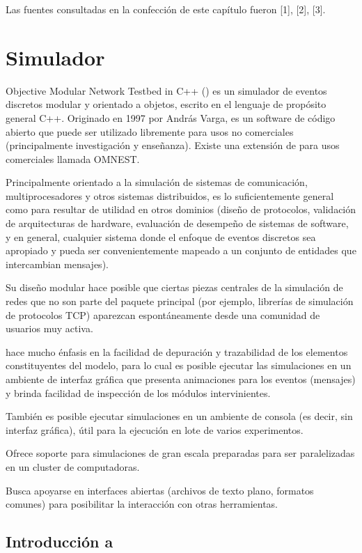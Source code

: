 Las fuentes consultadas en la confección de este capítulo fueron [1], [2], [3].

\section{Simulador \omnetpp{}}

Objective Modular Network Testbed in C++ (\omnetpp{}) es un simulador de eventos
discretos modular y orientado a objetos, escrito en el lenguaje de propósito
general C++. Originado en 1997 por András Varga, es un software de código
abierto que puede ser utilizado libremente para usos no comerciales
(principalmente investigación y enseñanza). Existe una extensión de \omnetpp{}
para usos comerciales llamada OMNEST.

Principalmente orientado a la simulación de sistemas de comunicación,
multiprocesadores y otros sistemas distribuidos, \omnetpp{} es lo suficientemente
general como para resultar de utilidad en otros dominios (diseño de protocolos,
validación de arquitecturas de hardware, evaluación de desempeño de sistemas de
software, y en general, cualquier sistema donde el enfoque de eventos discretos
sea apropiado y pueda ser convenientemente mapeado a un conjunto de entidades
que intercambian mensajes).

Su diseño modular hace posible que ciertas piezas centrales de la simulación de
redes que no son parte del paquete principal (por ejemplo, librerías de
simulación de protocolos TCP) aparezcan espontáneamente desde una comunidad de
usuarios muy activa.

\omnetpp{} hace mucho énfasis en la facilidad de depuración y trazabilidad de
los elementos constituyentes del modelo, para lo cual es posible ejecutar las
simulaciones en un ambiente de interfaz gráfica que presenta animaciones para
los eventos (mensajes) y brinda facilidad de inspección de los módulos
intervinientes.

También es posible ejecutar simulaciones en un ambiente de consola (es decir,
sin interfaz gráfica), útil para la ejecución en lote de varios experimentos.

Ofrece soporte para simulaciones de gran escala preparadas para ser
paralelizadas en un cluster de computadoras.

Busca apoyarse en interfaces abiertas (archivos de texto plano, formatos
comunes) para posibilitar la interacción con otras herramientas.

\subsection{Introducción a \omnetpp{}}

